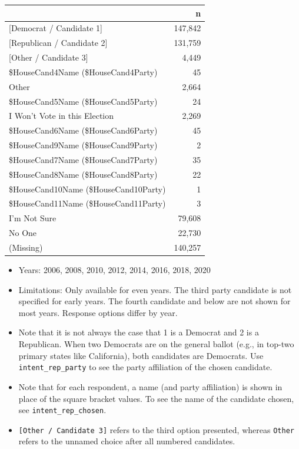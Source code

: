 \documentclass[10pt,article,oneside]{memoir}
\theoremstyle{definition}
\begin{document}
\begin{table}[H]
\centering
\begin{tabular}{lr}
\toprule
 & n\\
\midrule
{[Democrat / Candidate 1]} & 147,842\\
{[Republican / Candidate 2]} & 131,759\\
{[Other / Candidate 3]} & 4,449\\
\$HouseCand4Name (\$HouseCand4Party) & 45\\
Other & 2,664\\
\$HouseCand5Name (\$HouseCand5Party) & 24\\
I Won't Vote in this Election & 2,269\\
\$HouseCand6Name (\$HouseCand6Party) & 45\\
\$HouseCand9Name (\$HouseCand9Party) & 2\\
\$HouseCand7Name (\$HouseCand7Party) & 35\\
\$HouseCand8Name (\$HouseCand8Party) & 22\\
\$HouseCand10Name (\$HouseCand10Party) & 1\\
\$HouseCand11Name (\$HouseCand11Party) & 3\\
I'm Not Sure & 79,608\\
No One & 22,730\\
(Missing) & 140,257\\
\bottomrule
\end{tabular}
\end{table}

\begin{itemize}
\tightlist
\item
  Years: 2006, 2008, 2010, 2012, 2014, 2016, 2018, 2020
\item
  Limitations: Only available for even years. The third party candidate
  is not specified for early years. The fourth candidate and below are
  not shown for most years. Response options differ by year.
\item
  Note that it is not always the case that 1 is a Democrat and 2 is a
  Republican. When two Democrats are on the general ballot (e.g., in
  top-two primary states like California), both candidates are
  Democrats. Use \texttt{intent\_rep\_party} to see the party
  affiliation of the chosen candidate.
\item
  Note that for each respondent, a name (and party affiliation) is shown
  in place of the square bracket values. To see the name of the
  candidate chosen, see \texttt{intent\_rep\_chosen}.
\item
  \texttt{{[}Other\ /\ Candidate\ 3{]}} refers to the third option
  presented, whereas \texttt{Other} refers to the unnamed choice after
  all numbered candidates.
\end{itemize}
\end{document}
